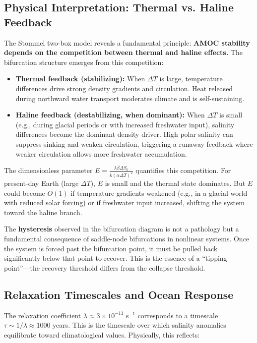 \documentclass[12pt,letterpaper]{article}
\begin{document}
\subsection{Physical Interpretation: Thermal vs. Haline Feedback}

The Stommel two-box model reveals a fundamental principle: \textbf{AMOC stability depends on the competition between thermal and haline effects.} The bifurcation structure emerges from this competition:

\begin{itemize}

\item \textbf{Thermal feedback (stabilizing):} When $\Delta T$ is large, temperature differences drive strong density gradients and circulation. Heat released during northward water transport moderates climate and is self-sustaining.

\item \textbf{Haline feedback (destabilizing, when dominant):} When $\Delta T$ is small (e.g., during glacial periods or with increased freshwater input), salinity differences become the dominant density driver. High polar salinity can suppress sinking and weaken circulation, triggering a runaway feedback where weaker circulation allows more freshwater accumulation.

\end{itemize}

The dimensionless parameter $E = \frac{\lambda\beta\Delta S_0}{k(\alpha\Delta T)^2}$ quantifies this competition. For present-day Earth (large $\Delta T$), $E$ is small and the thermal state dominates. But $E$ could become $O(1)$ if temperature gradients weakened (e.g., in a glacial world with reduced solar forcing) or if freshwater input increased, shifting the system toward the haline branch.

The \textbf{hysteresis} observed in the bifurcation diagram is not a pathology but a fundamental consequence of saddle-node bifurcations in nonlinear systems. Once the system is forced past the bifurcation point, it must be pulled back significantly below that point to recover. This is the essence of a ``tipping point''---the recovery threshold differs from the collapse threshold.

\subsection{Relaxation Timescales and Ocean Response}

The relaxation coefficient $\lambda \approx 3 \times 10^{-11}$ s$^{-1}$ corresponds to a timescale $\tau \sim 1/\lambda \approx 1000$ years. This is the timescale over which salinity anomalies equilibrate toward climatological values. Physically, this reflects:
\end{document}
